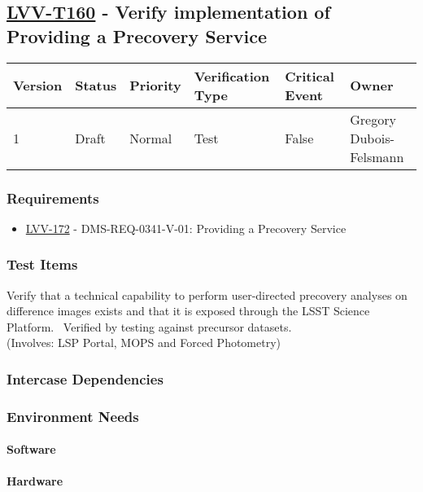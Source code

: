 \subsection{\href{https://jira.lsstcorp.org/secure/Tests.jspa\#/testCase/LVV-T160}{LVV-T160}
    - Verify implementation of Providing a Precovery Service}\label{lvv-t160}

\begin{longtable}[]{llllll}
\toprule
Version & Status & Priority & Verification Type & Critical Event & Owner
\\\midrule
1 & Draft & Normal &
Test & False & Gregory Dubois-Felsmann
\\\bottomrule
\end{longtable}

\subsubsection{Requirements}
\begin{itemize}
\item \href{https://jira.lsstcorp.org/browse/LVV-172}{LVV-172} - DMS-REQ-0341-V-01: Providing a Precovery Service
\end{itemize}

\subsubsection{Test Items}
Verify that a technical capability to perform user-directed precovery
analyses on difference images exists and that it is exposed through the
LSST Science Platform. ~Verified by testing against precursor
datasets.\\
(Involves: LSP Portal, MOPS and Forced Photometry)



\subsubsection{Intercase Dependencies}

\subsubsection{Environment Needs}

\paragraph{Software}

\paragraph{Hardware}

